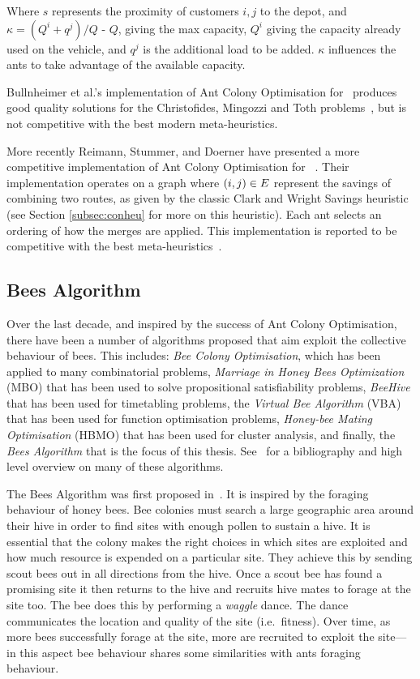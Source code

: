 Where $s$ represents the proximity of customers $i, j$ to the depot, and $\kappa = (Q^i + q^j) / Q$ - $Q$, giving the max capacity, $Q^i$ giving the capacity already used on the vehicle, and $q^j$ is the additional load to be added. $\kappa$ influences the ants to take advantage of the available capacity. 

Bullnheimer et al.'s implementation of Ant Colony Optimisation for \VRP\ produces good quality solutions for the Christofides, Mingozzi and Toth problems~\cite{CMT:1981}, but is not competitive with the best modern meta-heuristics.

More recently Reimann, Stummer, and Doerner have presented a more competitive implementation of Ant Colony Optimisation for \VRP~\cite{RSD:2002}. Their implementation operates on a graph where $(i,j) \in E$ represent the savings of combining two routes, as given by the classic Clark and Wright Savings heuristic (see Section \ref{subsec:conheu} for more on this heuristic). Each ant selects an ordering of how the merges are applied. This implementation is reported to be competitive with the best meta-heuristics~\cite{Potvin:2009}.   

\subsection{Bees Algorithm}
\label{subsec:beesalgorithm}

Over the last decade, and inspired by the success of Ant Colony Optimisation, there have been a number of algorithms proposed that aim exploit the collective behaviour of bees. This includes: \emph{Bee Colony Optimisation}, which has been applied to many combinatorial problems, \emph{Marriage in Honey Bees Optimization} (MBO) that has been used to solve propositional satisfiability problems, \emph{BeeHive} that has been used for timetabling problems, the \emph{Virtual Bee Algorithm} (VBA) that has been used for function optimisation problems, \emph{Honey-bee Mating Optimisation} (HBMO) that has been used for cluster analysis, and finally, the \emph{Bees Algorithm} that is the focus of this thesis. See~\cite{LJDS:2009} for a bibliography and high level overview on many of these algorithms. 

The Bees Algorithm was first proposed in~\cite{PGKORZ:2005}. It is inspired by the foraging behaviour of honey bees. Bee colonies must search a large geographic area around their hive in order to find sites with enough pollen to sustain a hive. It is essential that the colony makes the right choices in which sites are exploited and how much resource is expended on a particular site. They achieve this by sending scout bees out in all directions from the hive. Once a scout bee has found a promising site it then returns to the hive and recruits hive mates to forage at the site too. The bee does this by performing a \emph{waggle} dance. The dance communicates the location and quality of the site (i.e.~fitness). Over time, as more bees successfully forage at the site, more are recruited to exploit the site---in this aspect bee behaviour shares some similarities with ants foraging behaviour. 

